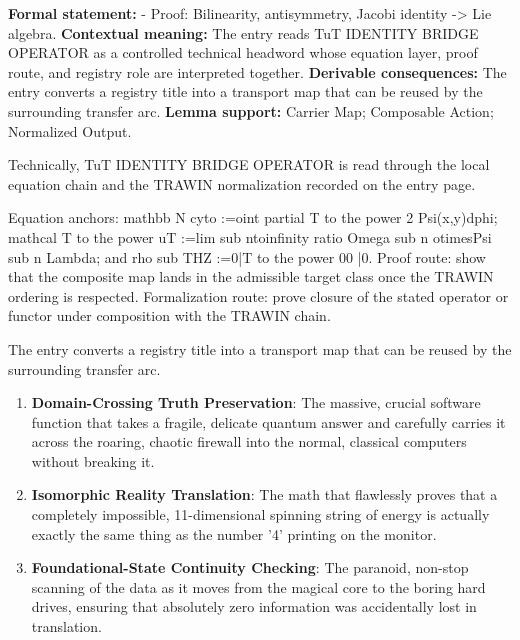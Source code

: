\begingroup\footnotesize\setlength{\emergencystretch}{3em}\sloppy
\textbf{Formal statement:} - Proof: Bilinearity, antisymmetry, Jacobi identity -> Lie algebra. \textbf{Contextual meaning:} The entry reads TuT IDENTITY BRIDGE OPERATOR as a controlled technical headword whose equation layer, proof route, and registry role are interpreted together. \textbf{Derivable consequences:} The entry converts a registry title into a transport map that can be reused by the surrounding transfer arc. \textbf{Lemma support:} Carrier Map; Composable Action; Normalized Output.\par
\endgroup

Technically, TuT IDENTITY BRIDGE OPERATOR is read through the local equation chain and the TRAWIN normalization recorded on the entry page.

Equation anchors: mathbb N cyto :=oint partial T to the power 2 Psi(x,y)dphi; mathcal T to the power uT :=lim sub ntoinfinity ratio Omega sub n otimesPsi sub n Lambda; and rho sub THZ :=0|T to the power 00 |0. Proof route: show that the composite map lands in the admissible target class once the TRAWIN ordering is respected. Formalization route: prove closure of the stated operator or functor under composition with the TRAWIN chain.

The entry converts a registry title into a transport map that can be reused by the surrounding transfer arc.
\endgroup

\begin{enumerate}[leftmargin=1.6em,itemsep=6pt,topsep=4pt]
\item \textbf{Domain-Crossing Truth Preservation}: The massive, crucial software function that takes a fragile, delicate quantum answer and carefully carries it across the roaring, chaotic firewall into the normal, classical computers without breaking it.
\item \textbf{Isomorphic Reality Translation}: The math that flawlessly proves that a completely impossible, 11-dimensional spinning string of energy is actually exactly the same thing as the number '4' printing on the monitor.
\item \textbf{Foundational-State Continuity Checking}: The paranoid, non-stop scanning of the data as it moves from the magical core to the boring hard drives, ensuring that absolutely zero information was accidentally lost in translation.
\end{enumerate}

